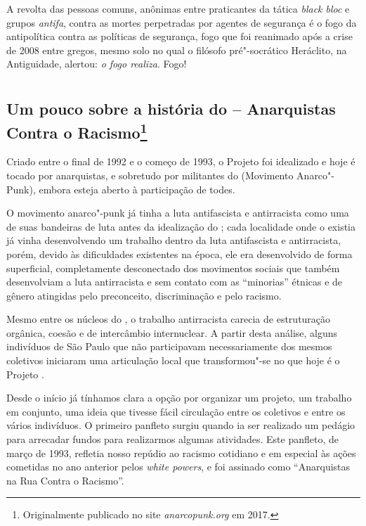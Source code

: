 A revolta das pessoas comuns, anônimas entre praticantes da tática
\emph{black bloc} e grupos \emph{antifa}, contra as mortes perpetradas
por agentes de segurança é o fogo da antipolítica contra as políticas de
segurança, fogo que foi reanimado após a crise de 2008 entre gregos,
mesmo solo no qual o filósofo pré"-socrático Heráclito, na Antiguidade,
alertou: \emph{o fogo realiza}. Fogo!


\part{}

\chapter[Um pouco sobre a história do \versal{ACR}]{Um pouco sobre a história do  -- Anarquistas Contra o Racismo\footnote[*]{Originalmente publicado no site \emph{anarcopunk.org} em 2017.}}
\label{acr}

Criado entre o final de 1992 e o começo de 1993, o Projeto  foi idealizado e hoje é tocado por anarquistas, e sobretudo por militantes do  (Movimento Anarco"-Punk), embora esteja aberto à participação de todes.

O movimento anarco"-punk já tinha a luta antifascista e antirracista como uma de suas bandeiras de luta antes da idealização do ; cada localidade onde o  existia já vinha desenvolvendo um trabalho dentro da luta antifascista e antirracista, porém, devido às dificuldades existentes na época, ele era desenvolvido de forma superficial, completamente desconectado dos movimentos sociais que também desenvolviam a luta antirracista e sem contato com as ``minorias'' étnicas e de gênero atingidas pelo preconceito, discriminação e pelo racismo.

Mesmo entre os núcleos do , o trabalho antirracista carecia de estruturação orgânica, coesão e de intercâmbio internuclear. A partir desta análise, alguns indivíduos de São Paulo que não participavam necessariamente dos mesmos coletivos iniciaram uma articulação local que transformou"-se no que hoje é o Projeto .

Desde o início já tínhamos clara a opção por organizar um projeto, um trabalho em conjunto, uma ideia que tivesse fácil circulação entre os coletivos e entre os vários indivíduos. O primeiro panfleto surgiu quando ia ser realizado um pedágio para arrecadar fundos para realizarmos algumas atividades. Este panfleto, de março de 1993, refletia nosso repúdio ao racismo cotidiano e em especial às ações cometidas no ano anterior pelos \emph{white powers}, e foi assinado como ``Anarquistas na Rua Contra o Racismo''.

